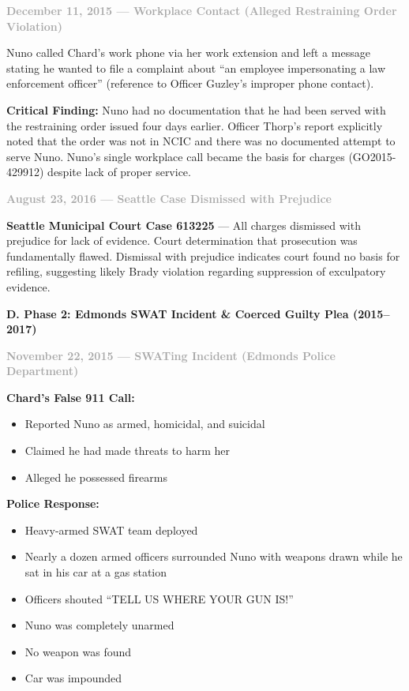 \documentclass[11pt, letterpaper]{article}
\newcommand{\subsectiontitle}[1]{\vspace{0.15in}\noindent\textcolor{NavyBlue}{\textbf{#1}}\vspace{0.05in}}
\newcommand{\subsubsectiontitle}[1]{\vspace{0.1in}\noindent\textcolor{DarkGray}{\textbf{#1}}\vspace{0.05in}}
\begin{document}
\subsubsectiontitle{December 11, 2015 --- Workplace Contact (Alleged Restraining Order Violation)}

Nuno called Chard's work phone via her work extension and left a message stating he wanted to file a complaint about ``an employee impersonating a law enforcement officer'' (reference to Officer Guzley's improper phone contact).

\textbf{Critical Finding:} Nuno had no documentation that he had been served with the restraining order issued four days earlier. Officer Thorp's report explicitly noted that the order was not in NCIC and there was no documented attempt to serve Nuno. Nuno's single workplace call became the basis for charges (GO2015-429912) despite lack of proper service.

\subsubsectiontitle{August 23, 2016 --- Seattle Case Dismissed with Prejudice}

\textbf{Seattle Municipal Court Case 613225} --- All charges dismissed with prejudice for lack of evidence. Court determination that prosecution was fundamentally flawed. Dismissal with prejudice indicates court found no basis for refiling, suggesting likely Brady violation regarding suppression of exculpatory evidence.

\subsectiontitle{D. Phase 2: Edmonds SWAT Incident \& Coerced Guilty Plea (2015--2017)}

\subsubsectiontitle{November 22, 2015 --- SWATing Incident (Edmonds Police Department)}

\textbf{Chard's False 911 Call:}
\begin{itemize}[leftmargin=*,itemsep=2pt]
    \item Reported Nuno as armed, homicidal, and suicidal
    \item Claimed he had made threats to harm her
    \item Alleged he possessed firearms
\end{itemize}

\textbf{Police Response:}
\begin{itemize}[leftmargin=*,itemsep=2pt]
    \item Heavy-armed SWAT team deployed
    \item Nearly a dozen armed officers surrounded Nuno with weapons drawn while he sat in his car at a gas station
    \item Officers shouted ``TELL US WHERE YOUR GUN IS!''
    \item Nuno was completely unarmed
    \item No weapon was found
    \item Car was impounded
\end{itemize}
\end{document}
